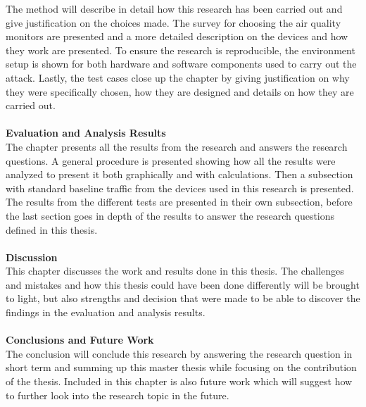The method will describe in detail how this research has been carried out and give justification on the choices made. The survey for choosing the air quality monitors are presented and a more detailed description on the devices and how they work are presented. To ensure the research is reproducible, the environment setup is shown for both hardware and software components used to carry out the attack. Lastly, the test cases close up the chapter by giving justification on why they were specifically chosen, how they are designed and details on how they are carried out. 
\\\\
\textbf{Evaluation and Analysis Results}
\\
The chapter presents all the results from the research and answers the research questions. A general procedure is presented showing how all the results were analyzed to present it both graphically and with calculations. Then a subsection with standard baseline traffic from the devices used in this research is presented. The results from the different tests are presented in their own subsection, before the last section goes in depth of the results to answer the research questions defined in this thesis.  
\\\\
\textbf{Discussion}
\\
This chapter discusses the work and results done in this thesis. The challenges and mistakes and how this thesis could have been done differently will be brought to light, but also strengths and decision that were made to be able to discover the findings in the evaluation and analysis results. 
\\\\
\textbf{Conclusions and Future Work}
\\
The conclusion will conclude this research by answering the research question in short term and summing up this master thesis while focusing on the contribution of the thesis. Included in this chapter is also future work which will suggest how to further look into the research topic in the future.